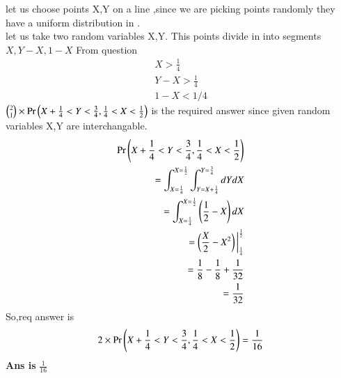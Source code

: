 let us choose points X,Y on a line ,since we are picking points randomly they have a uniform distribution in .\\
let us take two random variables X,Y.
This points divide in into segments $X,Y-X,1-X$
From question
\begin{align}
X > \frac{1}{4}\\
Y-X> \frac{1}{4}\\
1-X< 1/4
\end{align}
$\binom{2}{1}\times\Pr\left(X+\frac{1}{4}< Y < \frac{3}{4},\frac{1}{4}<X<\frac{1}{2} \right)$ is the required answer since
 given random variables  X,Y are interchangable.
\begin{align}
    \Pr\left(X+\frac{1}{4}< Y < \frac{3}{4},\frac{1}{4}<X<\frac{1}{2}\right)\\= \int_{X=\frac{1}{4}}^{X=\frac{1}{2}}\int_{Y=X+\frac{1}{4}}^{Y=\frac{3}{4}}dY dX
    \\=\int_{X=\frac{1}{4}}^{X=\frac{1}{2}}\left(\frac{1}{2}-X\right)dX
    \\=\left(\frac{X}{2}- X^{2}\right)\bigg|_{\frac{1}{4}}^{\frac{1}{2}}
    \\=\frac{1}{8}-\frac{1}{8}+\frac{1}{32}
    \\=\frac{1}{32}
\end{align}
So,req answer is $$2\times\Pr\left(X+\frac{1}{4}< Y < \frac{3}{4},\frac{1}{4}<X<\frac{1}{2} \right)=\frac{1}{16}$$
  \textbf{Ans is} $\frac{1}{16}$